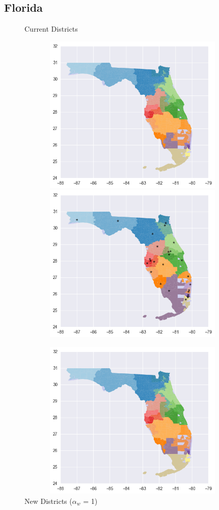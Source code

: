 \clearpage
\newpage

\subsection{Florida}
\begin{figure}[htb!] \centering
\caption{ Current Districts }
\includegraphics[width=5in,height=3in,keepaspectratio]{../maps/FL/static/before.png}
\includegraphics[width=5in,height=3in,keepaspectratio]{../maps/FL/static/0_0_after.png}
\caption{ New Districts ($\alpha_w$ = 1) }
\includegraphics[width=5in,height=3in,keepaspectratio]{../maps/FL/static/before.png}

\end{figure}
